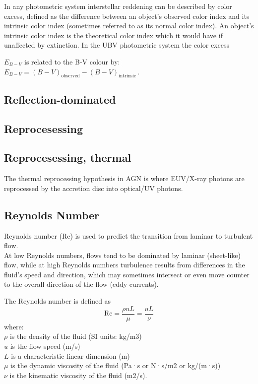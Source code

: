 \documentclass[11pt]{article}
\begin{document}
In any photometric system interstellar reddening can be described by color excess, defined as the difference between an object's observed color index and its intrinsic color index (sometimes referred to as its normal color index). An object's intrinsic color index is the theoretical color index which it would have if unaffected by extinction. In the UBV photometric system the color excess {$E_{B-V}$ is related to the B-V colour by:
$E_{B-V}=(B-V)_{\textrm  {observed}} - (B-V)_{\textrm  {intrinsic}}\,$. 

\subsection*{Reflection-dominated}


\subsection*{Reprocesessing}

\subsection*{Reprocesessing, thermal}
The thermal reprocessing hypothesis in AGN is where EUV/X-ray photons
are reprocessed by the accretion disc into optical/UV photons. 



\subsection*{Reynolds Number}

Reynolds number (Re) is used to predict the transition from laminar to turbulent flow. \\
At low Reynolds numbers, flows tend to be dominated
by laminar (sheet-like) flow, while at high Reynolds numbers
turbulence results from differences in the fluid's speed and
direction, which may sometimes intersect or even move counter to the
overall direction of the flow (eddy currents).

The Reynolds number is defined as
\begin{equation}
\mathrm {Re} ={\frac {\rho u L} {\mu}} = {\frac {u L}{\nu }} 
\end{equation}
where: \\
$\rho$ is the density of the fluid (SI units: kg/m3) \\
$u$ is the flow speed (m/s) \\ 
$L$ is a characteristic linear dimension (m) \\
$\mu$ is the dynamic viscosity of the fluid (Pa·s  or N·s/m2 or kg/(m·s))\\
$\nu$ is the kinematic viscosity of the fluid (m2/s). \\

}
\end{document}
